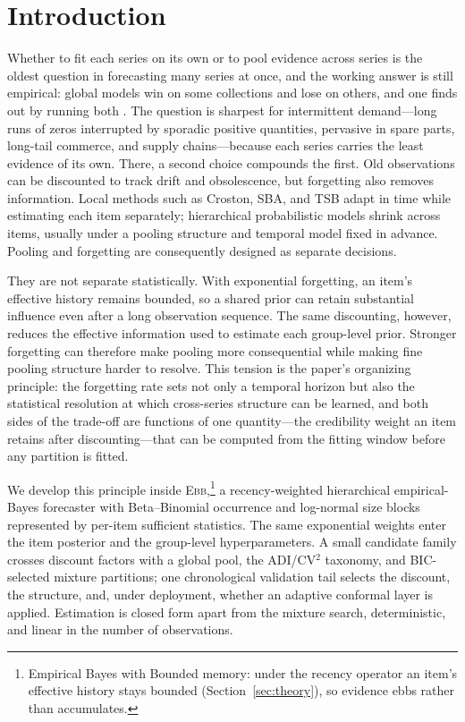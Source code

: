 \documentclass[twoside]{article}
\theoremstyle{definition}
\newcommand{\EBB}{\textsc{Ebb}}
\begin{document}
\section{Introduction}\label{sec:intro}

Whether to fit each series on its own or to pool evidence across series
is the oldest question in forecasting many series at once, and the
working answer is still empirical: global models win on some collections
and lose on others, and one finds out by running both
\citep{monteromanso2021,januschowski2020,hewamalage2022}. The question is
sharpest for intermittent demand---long runs of zeros interrupted by
sporadic positive quantities, pervasive in spare parts, long-tail
commerce, and supply chains---because each series carries the least
evidence of its own. There, a second choice compounds the first. Old
observations can be discounted to track drift and obsolescence, but
forgetting also removes information. Local methods such as Croston, SBA,
and TSB \citep{croston1972,syntetos2005accuracy,teunter2011} adapt in
time while estimating each item separately; hierarchical probabilistic
models \citep{chapados2014,seeger2016,pitkin2024} shrink across items,
usually under a pooling structure and temporal model fixed in advance.
Pooling and forgetting are consequently designed as separate decisions.

They are not separate statistically. With exponential forgetting, an
item's effective history remains bounded, so a shared prior can retain
substantial influence even after a long observation sequence. The same
discounting, however, reduces the effective information used to estimate
each group-level prior. Stronger forgetting can therefore make pooling
more consequential while making fine pooling structure harder to resolve.
This tension is the paper's organizing principle: the forgetting rate
sets not only a temporal horizon but also the statistical resolution at
which cross-series structure can be learned, and both sides of the
trade-off are functions of one quantity---the credibility weight an item
retains after discounting---that can be computed from the fitting window
before any partition is fitted.

We develop this principle inside
\EBB{},\footnote{Empirical Bayes with Bounded memory: under the recency
operator an item's effective history stays bounded
(Section~\ref{sec:theory}), so evidence ebbs rather than accumulates.} a
recency-weighted hierarchical empirical-Bayes forecaster with
Beta--Binomial occurrence and log-normal size blocks represented by
per-item sufficient statistics. The same exponential weights enter the
item posterior and the group-level hyperparameters. A small candidate
family crosses discount factors with a global pool, the ADI/CV$^2$
taxonomy, and BIC-selected mixture partitions; one chronological
validation tail selects the discount, the structure, and, under
deployment, whether an adaptive conformal layer is applied. Estimation is
closed form apart from the mixture search, deterministic, and linear in
the number of observations.
\end{document}
